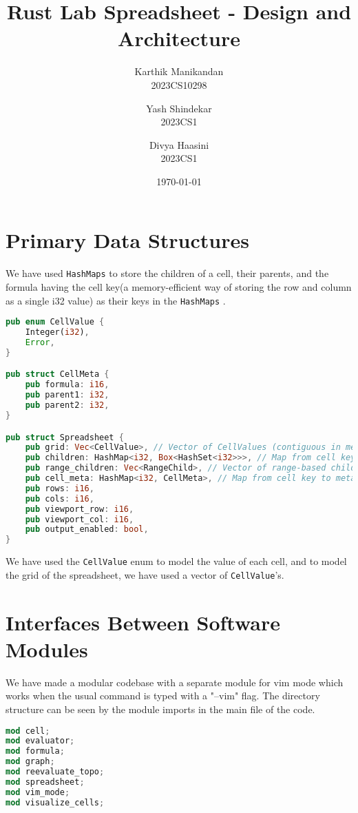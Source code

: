 \documentclass[11pt,a4paper]{article}
\title{Rust Lab Spreadsheet - Design and Architecture}
\author{
  Karthik Manikandan\\ 2023CS10298
  \and
  Yash Shindekar \\ 2023CS1
  \and
  Divya Haasini \\2023CS1
}
\date{\today}
\begin{document}
\maketitle
\tableofcontents
\newpage

\section{Primary Data Structures}
\label{sec:data-structures}  

We have used \lstinline{HashMaps} to store the children of a cell, their parents, and the formula having the cell key(a memory-efficient way of storing the row and column as a single i32 value) as their keys in the \lstinline{HashMaps} . 

\begin{lstlisting}[language=Rust, caption={The spreadsheet Struct having the Hashmaps as described}, label=lst:types]
pub enum CellValue {
    Integer(i32),
    Error,
}

pub struct CellMeta {
    pub formula: i16,
    pub parent1: i32,
    pub parent2: i32,
}

pub struct Spreadsheet {
    pub grid: Vec<CellValue>, // Vector of CellValues (contiguous in memory)
    pub children: HashMap<i32, Box<HashSet<i32>>>, // Map from cell key to boxed HashSet of children
    pub range_children: Vec<RangeChild>, // Vector of range-based child relationships
    pub cell_meta: HashMap<i32, CellMeta>, // Map from cell key to metadata
    pub rows: i16,
    pub cols: i16,
    pub viewport_row: i16,
    pub viewport_col: i16,
    pub output_enabled: bool,
}
\end{lstlisting}
We have used the \lstinline{CellValue} enum to model the value of each cell, and to model the grid of the spreadsheet, we have used a vector of \lstinline{CellValue}'s.


\section{Interfaces Between Software Modules}
\label{sec:interfaces}

We have made a modular codebase with a separate module for vim mode which works when the usual command is typed with a "--vim" flag.
The directory structure can be seen by the module imports in the main file of the code.

\begin{lstlisting}[language=Rust, caption={Modules of our codebase}, label=lst:modules]
mod cell;
mod evaluator;
mod formula;
mod graph;
mod reevaluate_topo;
mod spreadsheet;
mod vim_mode;
mod visualize_cells;
\end{lstlisting}
\end{document}
